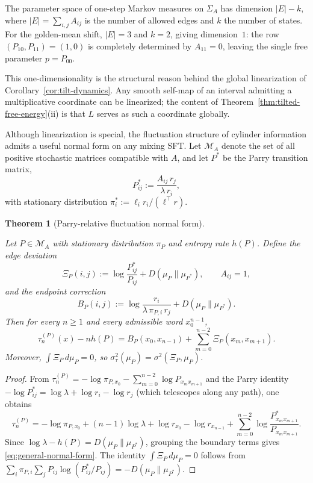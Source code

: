\documentclass[pdflatex,sn-basic,Numbered]{sn-jnl}
\theoremstyle{thmstyleone}
\newtheorem{theorem}{Theorem}[section]
\theoremstyle{thmstyletwo}
\theoremstyle{thmstylethree}
\newcommand{\leanverified}[1]{}
\begin{document}
The parameter space of one-step Markov measures on $\Sigma_A$ has dimension $|E|-k$, where $|E|=\sum_{i,j}A_{ij}$ is the number of allowed edges and $k$ the number of states. For the golden-mean shift, $|E|=3$ and $k=2$, giving dimension~$1$: the row $(P_{10},P_{11})=(1,0)$ is completely determined by $A_{11}=0$, leaving the single free parameter $p=P_{00}$.

This one-dimensionality is the structural reason behind the global linearization of Corollary~\ref{cor:tilt-dynamics}. Any smooth self-map of an interval admitting a multiplicative coordinate can be linearized; the content of Theorem~\ref{thm:tilted-free-energy}(ii) is that $L$ serves as such a coordinate globally.

Although linearization is special, the fluctuation structure of cylinder information admits a useful normal form on any mixing SFT. Let $\mathcal{M}_A$ denote the set of all positive stochastic matrices compatible with $A$, and let $P^*$ be the Parry transition matrix,
\begin{equation}\label{eq:parry-transition}
P^*_{ij}:=\frac{A_{ij}\,r_j}{\lambda\,r_i},
\end{equation}
with stationary distribution $\pi^*_i:=\ell_ir_i/(\ell^\top r)$.

\begin{theorem}[Parry-relative fluctuation normal form]\label{thm:general-normal-form}
\leanverified{paper_zero_jitter_general_normal_form}
Let $P\in\mathcal{M}_A$ with stationary distribution $\pi_P$ and entropy rate $h(P)$. Define the edge deviation
\[
\Xi_P(i,j):=\log\frac{P^*_{ij}}{P_{ij}}+D(\mu_P\|\mu_{P^*}),
\qquad A_{ij}=1,
\]
and the endpoint correction
\[
B_P(i,j):=\log\frac{r_i}{\lambda\,\pi_{P,i}\,r_j}+D(\mu_P\|\mu_{P^*}).
\]
Then for every $n\ge 1$ and every admissible word $x_0^{n-1}$,
\begin{equation}\label{eq:general-normal-form}
\tau_n^{(P)}(x)-nh(P)=B_P(x_0,x_{n-1})+\sum_{m=0}^{n-2}\Xi_P(x_m,x_{m+1}).
\end{equation}
Moreover, $\int\Xi_P\,d\mu_P=0$, so $\sigma_\tau^2(\mu_P)=\sigma^2(\Xi_P,\mu_P)$.
\end{theorem}

\begin{proof}
From $\tau_n^{(P)}=-\log\pi_{P,x_0}-\sum_{m=0}^{n-2}\log P_{x_mx_{m+1}}$ and the Parry identity $-\log P^*_{ij}=\log\lambda+\log r_i-\log r_j$ (which telescopes along any path), one obtains
\[
\tau_n^{(P)}=-\log\pi_{P,x_0}+(n-1)\log\lambda+\log r_{x_0}-\log r_{x_{n-1}}+\sum_{m=0}^{n-2}\log\frac{P^*_{x_mx_{m+1}}}{P_{x_mx_{m+1}}}.
\]
Since $\log\lambda-h(P)=D(\mu_P\|\mu_{P^*})$, grouping the boundary terms gives \eqref{eq:general-normal-form}. The identity $\int\Xi_P\,d\mu_P=0$ follows from $\sum_i\pi_{P,i}\sum_jP_{ij}\log(P^*_{ij}/P_{ij})=-D(\mu_P\|\mu_{P^*})$.
\end{proof}
\end{document}
